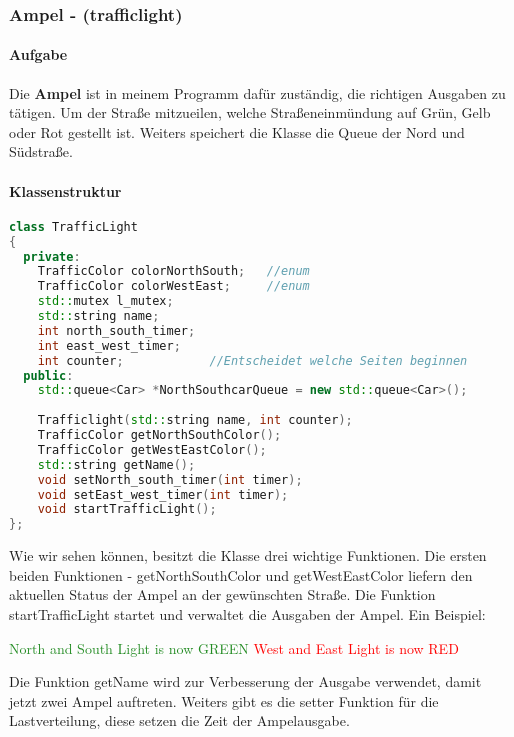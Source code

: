 \documentclass[12pt, oneside]{article}
\begin{document}
\subsubsection{Ampel - (trafficlight)}
\paragraph{Aufgabe}
Die \textbf{Ampel} ist in meinem Programm dafür zuständig, die richtigen Ausgaben zu tätigen. Um der Straße mitzueilen, welche Straßeneinmündung auf Grün, Gelb oder Rot gestellt ist. Weiters speichert die Klasse die Queue der Nord und Südstraße.
\paragraph{Klassenstruktur}
\begin{lstlisting}[language=C++, caption={C++ trafficlight.h - Klassenstruktur}]
class TrafficLight
{
  private:
    TrafficColor colorNorthSouth;   //enum
    TrafficColor colorWestEast;     //enum
    std::mutex l_mutex;
    std::string name;
    int north_south_timer;
    int east_west_timer;
    int counter;            //Entscheidet welche Seiten beginnen
  public:
    std::queue<Car> *NorthSouthcarQueue = new std::queue<Car>();
    
    Trafficlight(std::string name, int counter);
    TrafficColor getNorthSouthColor();
    TrafficColor getWestEastColor();
    std::string getName();
    void setNorth_south_timer(int timer);
    void setEast_west_timer(int timer);
    void startTrafficLight();
};
\end{lstlisting}

\noindent Wie wir sehen können, besitzt die Klasse drei wichtige Funktionen. Die ersten beiden Funktionen - getNorthSouthColor und getWestEastColor liefern den aktuellen Status der Ampel an der gewünschten Straße. Die Funktion startTrafficLight startet und verwaltet die Ausgaben der Ampel. Ein Beispiel:\vspace{1em} 

\noindent [TrafficLight 1] \textcolor{ForestGreen}{North and South Light is now GREEN} \newline
[TrafficLight 1] \textcolor{red}{West and East Light is now RED}\vspace{1em} 

\noindent Die Funktion getName wird zur Verbesserung der Ausgabe verwendet, damit jetzt zwei Ampel auftreten. Weiters gibt es die setter Funktion für die Lastverteilung, diese setzen die Zeit der Ampelausgabe.\vspace{1em} 
\end{document}
